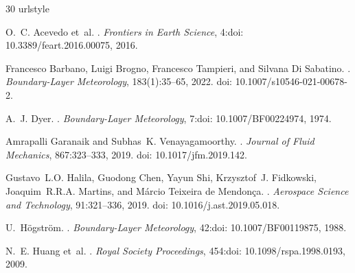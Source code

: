 \documentclass[11pt,a4paper]{article}
\begin{document}

\begin{thebibliography}{30}
\providecommand{\natexlab}[1]{#1}
\providecommand{\url}[1]{\texttt{#1}}
\expandafter\ifx\csname urlstyle\endcsname\relax
  \providecommand{\doi}[1]{doi: #1}\else
  \providecommand{\doi}{doi: \begingroup \urlstyle{rm}\Url}\fi

O.~C. Acevedo et~al.
.
\newblock \emph{Frontiers in Earth Science}, 4:\protect\doi{10.3389/feart.2016.00075}, 2016.

Francesco Barbano, Luigi Brogno, Francesco Tampieri, and Silvana Di Sabatino.
.
\newblock \emph{Boundary-Layer Meteorology}, 183(1):35--65, 2022.
\newblock \doi{10.1007/s10546-021-00678-2}.

A.~J. Dyer.
.
\newblock \emph{Boundary-Layer Meteorology}, 7:\protect\doi{10.1007/BF00224974}, 1974.

Amrapalli Garanaik and Subhas~K. Venayagamoorthy.
.
\newblock \emph{Journal of Fluid Mechanics}, 867:323--333, 2019.
\newblock \doi{10.1017/jfm.2019.142}.

Gustavo~L.O. Halila, Guodong Chen, Yayun Shi, Krzysztof~J. Fidkowski, Joaquim~R.R.A. Martins, and M\'arcio Teixeira de Mendon\c{c}a.
.
\newblock \emph{Aerospace Science and Technology}, 91:321--336, 2019.
\newblock \doi{10.1016/j.ast.2019.05.018}.

U.~Högström.
.
\newblock \emph{Boundary-Layer Meteorology}, 42:\protect\doi{10.1007/BF00119875}, 1988.

N.~E. Huang et~al.
.
\newblock \emph{Royal Society Proceedings}, 454:\protect\doi{10.1098/rspa.1998.0193}, 2009.


\end{thebibliography}
\end{document}
